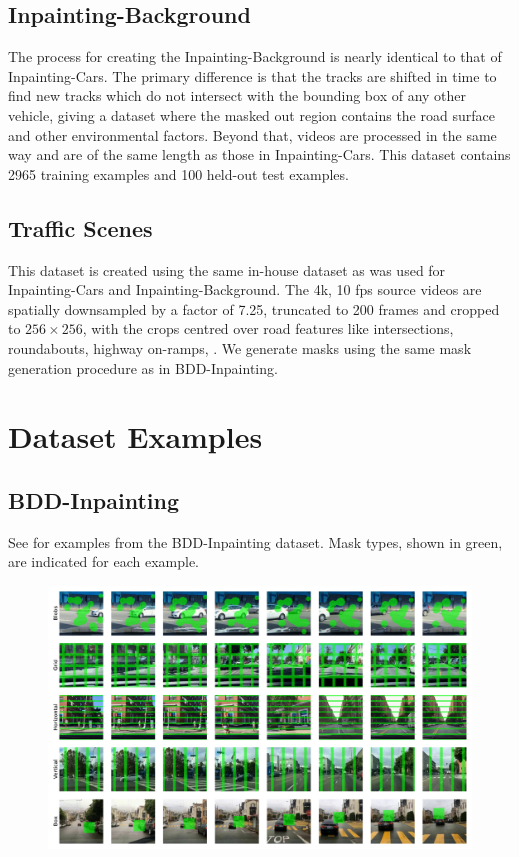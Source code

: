 \subsection{Inpainting-Background}
 The process for creating the Inpainting-Background is nearly identical to that of Inpainting-Cars. The primary difference is that the tracks are shifted in time to find new tracks which do not intersect with the bounding box of any other vehicle, giving a dataset where the masked out region contains the road surface and other environmental factors. Beyond that, videos are processed in the same way and are of the same length as those in Inpainting-Cars. This dataset contains 2965 training examples and 100 held-out test examples.  

 \subsection{Traffic Scenes}
This dataset is created using the same in-house dataset as was used for Inpainting-Cars and Inpainting-Background. The 4k, 10 fps source videos are spatially downsampled by a factor of 7.25, truncated to 200 frames and cropped to $256 \times 256$, with the crops centred over road features like intersections, roundabouts, highway on-ramps, \etc. We generate masks using the same mask generation procedure as in BDD-Inpainting. 
\section{Dataset Examples}
\label{sec:datasetexamples}
\subsection{BDD-Inpainting}
See  for examples from the BDD-Inpainting dataset. Mask types, shown in green, are indicated for each example.
\begin{figure}[h!]
\begin{center}
    \centering
    \captionsetup{type=figure}
    \includegraphics[width=\linewidth]{figures/dataset-examples/bdd-examples.pdf}
    \label{fig:bdd-examples}
\end{center}
\end{figure}
